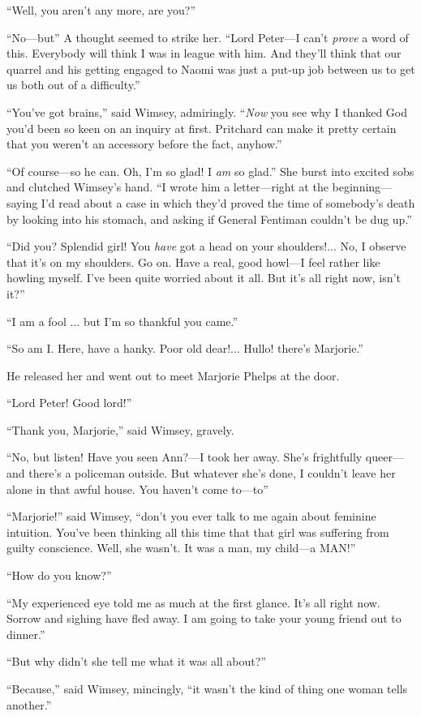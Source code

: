 \enquote{Well, you aren't any more, are you?}

\enquote{No\allowbreak---\allowbreak but\longdash} A thought seemed to strike her. \enquote{Lord Peter\allowbreak---\allowbreak I can't \textit{prove} a word of this. Everybody will think I was in league with him. And they'll think that our quarrel and his getting engaged to Naomi was just a put-up job between us to get us both out of a difficulty.}

\enquote{You've got brains,} said Wimsey, admiringly. \enquote{\textit{Now} you see why I thanked God you'd been so keen on an inquiry at first. Pritchard can make it pretty certain that you weren't an accessory before the fact, anyhow.}

\enquote{Of course\allowbreak---\allowbreak so he can. Oh, I'm so glad! I \textit{am} so glad.} She burst into excited sobs and clutched Wimsey's hand. \enquote{I wrote him a letter\allowbreak---\allowbreak right at the beginning\allowbreak---\allowbreak saying I'd read about a case in which they'd proved the time of somebody's death by looking into his stomach, and asking if General Fentiman couldn't be dug up.}

\enquote{Did you? Splendid girl! You \textit{have} got a head on your shoulders!... No, I observe that it's on my shoulders. Go on. Have a real, good howl\allowbreak---\allowbreak I feel rather like howling myself. I've been quite worried about it all. But it's all right now, isn't it?}

\enquote{I am a fool ... but I'm so thankful you came.}

\enquote{So am I. Here, have a hanky. Poor old dear!... Hullo! there's Marjorie.}

He released her and went out to meet Marjorie Phelps at the door.

\enquote{Lord Peter! Good lord!}

\enquote{Thank you, Marjorie,} said Wimsey, gravely.

\enquote{No, but listen! Have you seen Ann?---I took her away. She's frightfully queer\allowbreak---\allowbreak and there's a policeman outside. But whatever she's done, I couldn't leave her alone in that awful house. You haven't come to\allowbreak---\allowbreak to\longdash}

\enquote{Marjorie!} said Wimsey, \enquote{don't you ever talk to me again about feminine intuition. You've been thinking all this time that that girl was suffering from guilty conscience. Well, she wasn't. It was a man, my child\allowbreak---\allowbreak a MAN!}

\enquote{How do you know?}

\enquote{My experienced eye told me as much at the first glance. It's all right now. Sorrow and sighing have fled away. I am going to take your young friend out to dinner.}

\enquote{But why didn't she tell me what it was all about?}

\enquote{Because,} said Wimsey, mincingly, \enquote{it wasn't the kind of thing one woman tells another.}